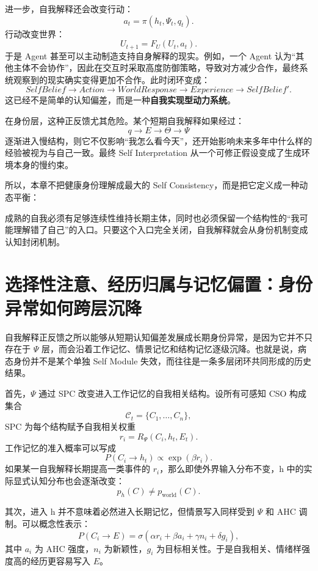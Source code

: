 进一步，自我解释还会改变行动：
\[
a_t
=
\pi(h_t,\Psi_t,q_t).
\]
行动改变世界：
\[
U_{t+1}
=
F_U(U_t,a_t).
\]
于是 Agent 甚至可以主动制造支持自身解释的现实。例如，一个 Agent 认为“其他主体不会协作”，因此在交互时采取高度防御策略，导致对方减少合作，最终系统观察到的现实确实变得更加不合作。此时闭环变成：
\[
SelfBelief
\rightarrow
Action
\rightarrow
WorldResponse
\rightarrow
Experience
\rightarrow
SelfBelief'.
\]
这已经不是简单的认知偏差，而是一种\textbf{自我实现型动力系统}。

在身份层，这种正反馈尤其危险。某个短期自我解释如果经过：
\[
q
\rightarrow
E
\rightarrow
\Theta
\rightarrow
\Psi
\]
逐渐进入慢结构，则它不仅影响“我怎么看今天”，还开始影响未来多年中什么样的经验被视为与自己一致。最终 Self Interpretation 从一个可修正假设变成了生成环境本身的慢约束。

所以，本章不把健康身份理解成最大的 Self Consistency，而是把它定义成一种动态平衡：
\begin{statementbox}
\centering
{}
\end{statementbox}
成熟的自我必须有足够连续性维持长期主体，同时也必须保留一个结构性的“我可能理解错了自己”的入口。只要这个入口完全关闭，自我解释就会从身份机制变成认知封闭机制。

\section{选择性注意、经历归属与记忆偏置：身份异常如何跨层沉降}

自我解释正反馈之所以能够从短期认知偏差发展成长期身份异常，是因为它并不只存在于 $\Psi$ 层，而会沿着工作记忆、情景记忆和结构记忆逐级沉降。也就是说，病态身份并不是某个单独 Self Module 失效，而往往是一条多层闭环共同形成的历史结果。

首先，$\Psi$ 通过 SPC 改变进入工作记忆的自我相关结构。设所有可感知 CSO 构成集合
\[
\mathcal C_t=
\{C_1,\ldots,C_n\},
\]
SPC 为每个结构赋予自我相关权重
\[
r_i
=
R_{\Psi}(C_i,h_t,E_t).
\]
工作记忆的准入概率可以写成
\[
P(C_i\rightarrow h_t)
\propto
\exp
\left(
\beta r_i
\right).
\]
如果某一自我解释长期提高一类事件的 $r_i$，那么即使外界输入分布不变，h 中的实际显式认知分布也会逐渐改变：
\[
p_h(C)
\neq
p_{\mathrm{world}}(C).
\]

其次，进入 h 并不意味着必然进入长期记忆，但情景写入同样受到 $\Psi$ 和 AHC 调制。可以概念性表示：
\[
P(C_i\rightarrow E)
=
\sigma
\left(
\alpha r_i
+
\beta a_i
+
\gamma n_i
+
\delta g_i
\right),
\]
其中 $a_i$ 为 AHC 强度，$n_i$ 为新颖性，$g_i$ 为目标相关性。于是自我相关、情绪样强度高的经历更容易写入 $E$。

